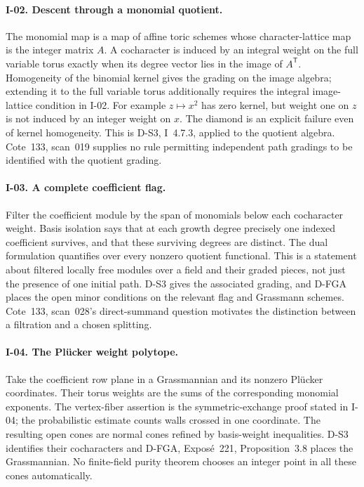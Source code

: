 \documentclass[11pt,a4paper]{article}
\theoremstyle{definition}\newtheorem{definition}{Definition}
\begin{document}
\paragraph{I-02. Descent through a monomial quotient.}
The monomial map is a map of affine toric schemes whose character-lattice map is the integer matrix $A$. A cocharacter is induced by an integral weight on the full variable torus exactly when its degree vector lies in the image of $A^{\mathsf T}$. Homogeneity of the binomial kernel gives the grading on the image algebra; extending it to the full variable torus additionally requires the integral image-lattice condition in I-02. For example $z\mapsto x^2$ has zero kernel, but weight one on $z$ is not induced by an integer weight on $x$. The diamond is an explicit failure even of kernel homogeneity. This is D-S3, I~4.7.3, applied to the quotient algebra. Cote~133, scan~019 supplies no rule permitting independent path gradings to be identified with the quotient grading.

\paragraph{I-03. A complete coefficient flag.}
Filter the coefficient module by the span of monomials below each cocharacter weight. Basis isolation says that at each growth degree precisely one indexed coefficient survives, and that these surviving degrees are distinct. The dual formulation quantifies over every nonzero quotient functional. This is a statement about filtered locally free modules over a field and their graded pieces, not just the presence of one initial path. D-S3 gives the associated grading, and D-FGA places the open minor conditions on the relevant flag and Grassmann schemes. Cote~133, scan~028's direct-summand question motivates the distinction between a filtration and a chosen splitting.

\paragraph{I-04. The Pl\"ucker weight polytope.}
Take the coefficient row plane in a Grassmannian and its nonzero Pl\"ucker coordinates. Their torus weights are the sums of the corresponding monomial exponents. The vertex-fiber assertion is the symmetric-exchange proof stated in I-04; the probabilistic estimate counts walls crossed in one coordinate. The resulting open cones are normal cones refined by basis-weight inequalities. D-S3 identifies their cocharacters and D-FGA, Expos\'e~221, Proposition~3.8 places the Grassmannian. No finite-field purity theorem chooses an integer point in all these cones automatically.
\end{document}
